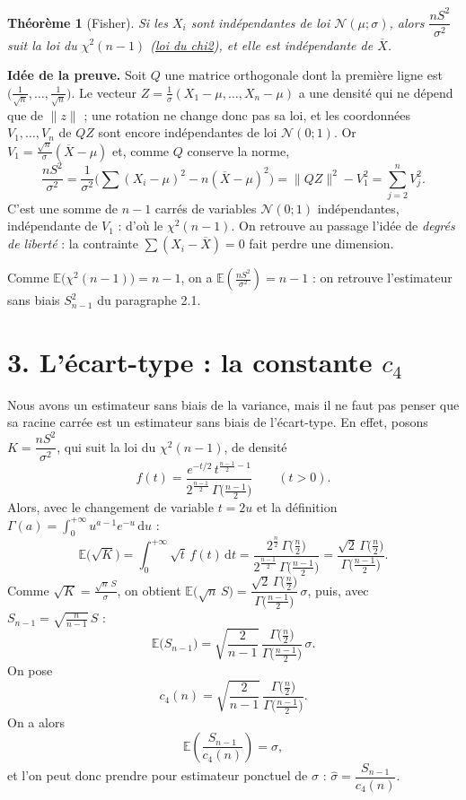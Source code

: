\documentclass[11pt,a4paper]{article}
\theoremstyle{sj}
\newtheorem*{thm}{Théorème}
\theoremstyle{remark}
\newcommand{\E}{\mathbb{E}}
\newcommand{\N}{\mathcal{N}}
\newcommand{\Xb}{\overline{X}}
\newcommand{\dd}{\,\mathrm{d}}
\begin{document}
\begin{thm}[Fisher]
Si les $X_i$ sont indépendantes de loi $\N(\mu;\sigma)$, alors $\dfrac{nS^2}{\sigma^2}$ suit la loi du $\chi^2(n-1)$ (\href{https://fr.wikipedia.org/w/index.php?title=Loi_du_\%CF\%87\%C2\%B2&oldid=161071288}{loi du chi2}), et elle est indépendante de $\Xb$.
\end{thm}

\textbf{Idée de la preuve.} Soit $Q$ une matrice orthogonale dont la première ligne est $\big(\frac{1}{\sqrt n},\dots,\frac{1}{\sqrt n}\big)$. Le vecteur $Z=\frac{1}{\sigma}(X_1-\mu,\dots,X_n-\mu)$ a une densité qui ne dépend que de $\|z\|$ ; une rotation ne change donc pas sa loi, et les coordonnées $V_1,\dots,V_n$ de $QZ$ sont encore indépendantes de loi $\N(0;1)$. Or $V_1=\frac{\sqrt n}{\sigma}(\Xb-\mu)$ et, comme $Q$ conserve la norme,
\[
\frac{nS^2}{\sigma^2}=\frac{1}{\sigma^2}\Big(\sum(X_i-\mu)^2-n(\Xb-\mu)^2\Big)=\|QZ\|^2-V_1^2=\sum_{j=2}^nV_j^2 .
\]
C'est une somme de $n-1$ carrés de variables $\N(0;1)$ indépendantes, indépendante de $V_1$ : d'où le $\chi^2(n-1)$. On retrouve au passage l'idée de \emph{degrés de liberté} : la contrainte $\sum(X_i-\Xb)=0$ fait perdre une dimension.

Comme $\E\big(\chi^2(n-1)\big)=n-1$, on a $\E\left(\frac{nS^2}{\sigma^2}\right)=n-1$ : on retrouve l'estimateur sans biais $S_{n-1}^2$ du paragraphe 2.1.

\section*{3. L'écart-type : la constante \texorpdfstring{$c_4$}{c4}}

Nous avons un estimateur sans biais de la variance, mais il ne faut pas penser que sa racine carrée est un estimateur sans biais de l'écart-type. En effet, posons $K=\dfrac{nS^2}{\sigma^2}$, qui suit la loi du $\chi^2(n-1)$, de densité
\[
f(t)=\frac{e^{-t/2}\,t^{\frac{n-1}{2}-1}}{2^{\frac{n-1}{2}}\,\Gamma\big(\frac{n-1}{2}\big)}\qquad(t>0).
\]
Alors, avec le changement de variable $t=2u$ et la définition $\Gamma(a)=\int_0^{+\infty}u^{a-1}e^{-u}\dd u$ :
\[
\E\big(\sqrt K\big)=\int_0^{+\infty}\sqrt t\,f(t)\dd t=\frac{2^{\frac n2}\,\Gamma\big(\frac n2\big)}{2^{\frac{n-1}{2}}\,\Gamma\big(\frac{n-1}{2}\big)}=\frac{\sqrt2\,\Gamma\big(\frac n2\big)}{\Gamma\big(\frac{n-1}{2}\big)} .
\]
Comme $\sqrt K=\frac{\sqrt n\,S}{\sigma}$, on obtient $\E\big(\sqrt n\,S\big)=\dfrac{\sqrt2\,\Gamma\big(\frac n2\big)}{\Gamma\big(\frac{n-1}{2}\big)}\,\sigma$, puis, avec $S_{n-1}=\sqrt{\frac{n}{n-1}}\,S$ :
\[
\E\big(S_{n-1}\big)=\sqrt{\frac{2}{n-1}}\,\frac{\Gamma\big(\frac n2\big)}{\Gamma\big(\frac{n-1}{2}\big)}\,\sigma .
\]
On pose
\[
c_4(n)=\sqrt{\frac{2}{n-1}}\,\frac{\Gamma\big(\frac n2\big)}{\Gamma\big(\frac{n-1}{2}\big)} .
\]
On a alors
\[
\E\left(\frac{S_{n-1}}{c_4(n)}\right)=\sigma ,
\]
et l'on peut donc prendre pour estimateur ponctuel de $\sigma$ : $\hat\sigma=\dfrac{S_{n-1}}{c_4(n)}$.
\end{document}
